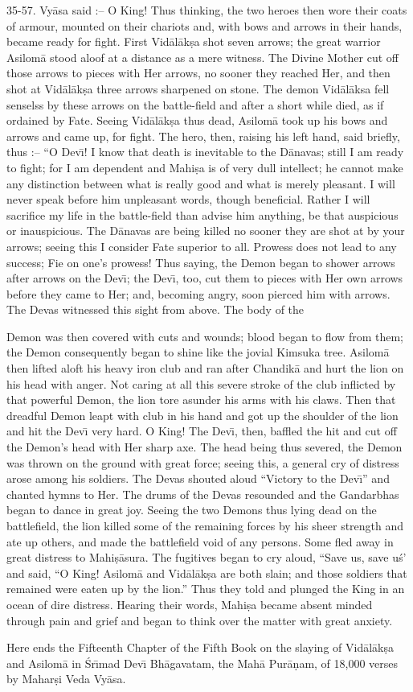 35-57. Vy\=asa said :-- O King! Thus thinking, the two heroes then wore their coats of armour, mounted on their chariots and, with bows and arrows in their hands, became ready for fight. First Vid\=al\=ak\d{s}a shot seven arrows; the great warrior Asilom\=a stood aloof at a distance as a mere witness. The Divine Mother cut off those arrows to pieces with Her arrows, no sooner they reached Her, and then shot at Vid\=al\=ak\d{s}a three arrows sharpened on stone. The demon Vid\=al\=aksa fell senselss by these arrows on the battle-field and after a short while died, as if ordained by Fate. Seeing Vid\=al\=ak\d{s}a thus dead, Asilom\=a took up his bows and arrows and came up, for fight. The hero, then, raising his left hand, said briefly, thus :-- ``O Dev\={\i}! I know that death is inevitable to the D\=anavas; still I am ready to fight; for I am dependent and Mahi\d{s}a is of very dull intellect; he cannot make any distinction between what is really good and what is merely pleasant. I will never speak before him unpleasant words, though beneficial. Rather I will sacrifice my life in the battle-field than advise him anything, be that auspicious or inauspicious. The D\=anavas are being killed no sooner they are shot at by your arrows; seeing this I consider Fate superior to all. Prowess does not lead to any success; Fie on one's prowess! Thus saying, the Demon began to shower arrows after arrows on the Dev\={\i}; the Dev\={\i}, too, cut them to pieces with Her own arrows before they came to Her; and, becoming angry, soon pierced him with arrows. The Devas witnessed this sight from above. The body of the

Demon was then covered with cuts and wounds; blood began to flow from them; the Demon consequently began to shine like the jovial Kimsuka tree. Asilom\=a then lifted aloft his heavy iron club and ran after Chandik\=a and hurt the lion on his head with anger. Not caring at all this severe stroke of the club inflicted by that powerful Demon, the lion tore asunder his arms with his claws. Then that dreadful Demon leapt with club in his hand and got up the shoulder of the lion and hit the Dev\={\i} very hard. O King! The Dev\={\i}, then, baffled the hit and cut off the Demon's head with Her sharp axe. The head being thus severed, the Demon was thrown on the ground with great force; seeing this, a general cry of distress arose among his soldiers. The Devas shouted aloud ``Victory to the Dev\={\i}'' and chanted hymns to Her. The drums of the Devas resounded and the Gandarbhas began to dance in great joy. Seeing the two Demons thus lying dead on the battlefield, the lion killed some of the remaining forces by his sheer strength and ate up others, and made the battlefield void of any persons. Some fled away in great distress to Mahi\d{s}\=asura. The fugitives began to cry aloud, ``Save us, save u\'s' and said, ``O King! Asilom\=a and Vid\=al\=ak\d{s}a are both slain; and those soldiers that remained were eaten up by the lion.'' Thus they told and plunged the King in an ocean of dire distress. Hearing their words, Mahi\d{s}a became absent minded through pain and grief and began to think over the matter with great anxiety.

Here ends the Fifteenth Chapter of the Fifth Book on the slaying of Vid\=al\=ak\d{s}a and Asilom\=a in \'Sr\={\i}mad Dev\={\i} Bh\=agavatam, the Mah\=a Pur\=a\d{n}am, of 18,000 verses by Mahar\d{s}i Veda Vy\=asa.




